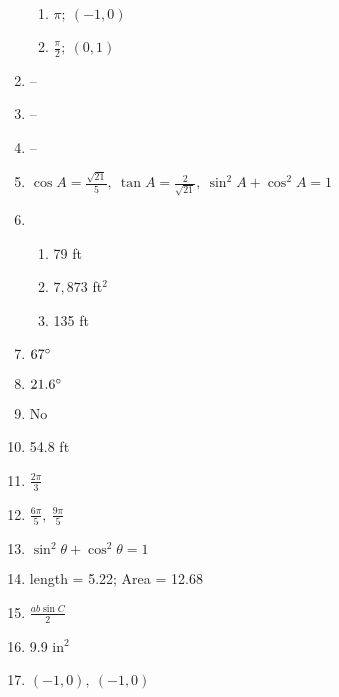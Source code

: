\documentclass{article}
\begin{document}
\begin{enumerate}
	\begin{enumerate}
	
	\item $\pi ; \ (-1,0)$
	
	\item $\frac{\pi}{2}; \ (0,1)$
	
	\end{enumerate}

\item --

\item -- 

\item --

\item $\cos{A} = \frac{\sqrt{21}}{5}, \ \tan{A} = \frac{2}{\sqrt{21}}, \  \sin^2{A} + \cos^2{A} = 1$

\item

	\begin{enumerate}
	
	\item 79 ft
	
	\item $7,873$ ft$^2$
	
	\item 135 ft
	
	\end{enumerate}
	
\item $67 \degree$

\item $21.6 \degree$

\item No

\item 54.8 ft

\item $\frac{2 \pi}{3}$

\item $\frac{6 \pi}{5}, \ \frac{9 \pi}{5}$

\item $\sin^2{\theta} + \cos^2{\theta} = 1$

\item length = 5.22; Area = 12.68

\item $\frac{ab \sin{C}}{2}$

\item 9.9 in$^2$

\item $(-1,0), \ (-1, 0)$


\end{enumerate}
\end{document}
